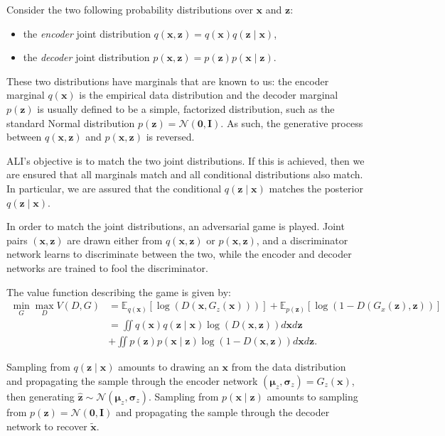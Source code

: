 \documentclass{article}
\begin{document}
Consider the two following probability distributions over $\bm{x}$ and $\bm{z}$:
\begin{itemize}
    \item the \emph{encoder} joint distribution
		$q(\bm{x}, \bm{z}) = q(\bm{x}) q(\bm{z} \mid \bm{x})$,
    \item the \emph{decoder} joint distribution
		$p(\bm{x}, \bm{z}) = p(\bm{z}) p(\bm{x} \mid \bm{z})$.
\end{itemize}
These two distributions have marginals that are known to us: the encoder
marginal $q(\bm{x})$ is the empirical data distribution and the decoder
marginal $p(\bm{z})$ is usually defined to be a simple, factorized
distribution, such as the standard Normal distribution $p(\bm{z}) =
\mathcal{N}(\bm{0},\bm{I})$. As such, the generative process between $q(\bm{x},
\bm{z})$ and $p(\bm{x}, \bm{z})$ is reversed.

ALI's objective is to match the two joint distributions. If this is achieved,
then we are ensured that all marginals match and all conditional distributions
also match. In particular, we are assured that the conditional $q(\bm{z} \mid
\bm{x})$ matches the posterior $q(\bm{z} \mid \bm{x})$.

In order to match the joint distributions, an adversarial game is played. Joint
pairs $(\bm{x}, \bm{z})$ are drawn either from $q(\bm{x}, \bm{z})$ or
$p(\bm{x}, \bm{z})$, and a discriminator network learns to discriminate between
the two, while the encoder and decoder networks are trained to fool the
discriminator.

The value function describing the game is given by:
\begin{equation}
\label{eq:value_function}
\begin{split}
    \min_G \max_D V(D, G)
	&= \mathbb{E}_{q(\bm{x})}[\log(D(\bm{x}, G_z(\bm{x})))]
	 + \mathbb{E}_{p(\bm{z})}[\log(1 - D(G_x(\bm{z}), \bm{z}))] \\
    &= \iint q(\bm{x}) q(\bm{z} \mid \bm{x})
		     \log(D(\bm{x}, \bm{z})) d\bm{x} d\bm{z} \\
    &+ \iint p(\bm{z}) p(\bm{x} \mid \bm{z})
			 \log(1 - D(\bm{x}, \bm{z})) d\bm{x} d\bm{z}.
\end{split}
\end{equation}

Sampling from $q(\bm{z} \mid \bm{x})$ amounts to drawing an $\bm{x}$ from the
data distribution and propagating the sample through the encoder network
$\left(\bm{\mu}_z,\bm{\sigma}_z\right) = G_z(\bm{x})$, then generating
$\hat{\bm{z}} \sim \mathcal{N}\left(\bm{\mu}_z,\bm{\sigma}_z\right)$. Sampling
from $p(\bm{x} \mid \bm{z})$ amounts to sampling from $p(\bm{z}) =
\mathcal{N}\left(\bm{0},\bm{I}\right)$ and propagating the sample through the
decoder network to recover $\tilde{\bm{x}}$.
\end{document}
